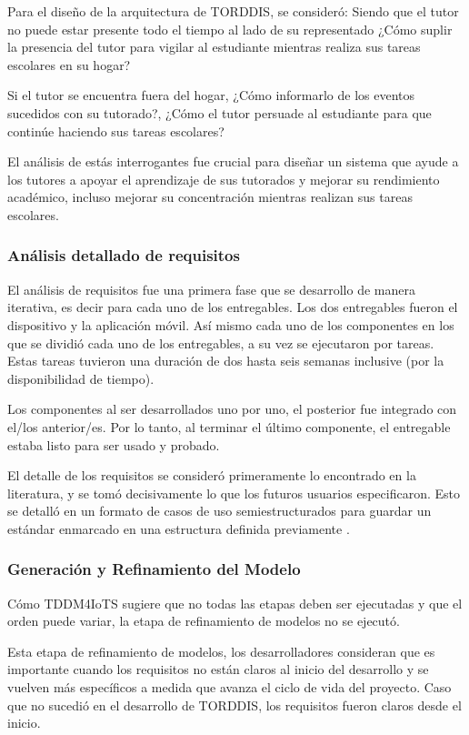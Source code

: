\documentclass[a4paper,fleqn]{cas-sc}
\begin{document}
				Para el diseño de la arquitectura de TORDDIS, se consideró: Siendo que el tutor no puede estar presente todo el tiempo al lado de su representado ¿Cómo suplir la presencia del tutor para vigilar al estudiante mientras realiza sus tareas escolares en su hogar?
			
				Si el tutor se encuentra fuera del hogar, ¿Cómo informarlo de los eventos sucedidos con su tutorado?, ¿Cómo el tutor persuade al estudiante para que continúe haciendo sus tareas escolares? 
			
				El análisis de estás interrogantes fue crucial para diseñar un sistema que ayude a los tutores a apoyar el aprendizaje de sus tutorados y mejorar su rendimiento académico, incluso mejorar su concentración mientras realizan sus tareas escolares.
			
			\subsubsection{Análisis detallado de requisitos}
				El análisis de requisitos fue una primera fase que se desarrollo de manera iterativa, es decir para cada uno de los entregables. Los dos entregables fueron el dispositivo y la aplicación móvil. Así mismo cada uno de los componentes en los que se dividió cada uno de los entregables, a su vez se ejecutaron por tareas. Estas tareas tuvieron una duración de dos hasta seis semanas inclusive (por la disponibilidad de tiempo).
			
				Los componentes al ser desarrollados uno por uno, el posterior fue integrado con el/los anterior/es. Por lo tanto, al terminar el último componente, el entregable estaba listo para ser usado y probado.
			
				El detalle de los requisitos se consideró primeramente lo encontrado en la literatura, y se tomó decisivamente lo que los futuros usuarios especificaron. Esto se detalló en un formato de casos de uso semiestructurados para guardar un estándar enmarcado en una estructura definida previamente \citep{Zegzhda2018Use}.
			
			\subsubsection{Generación y Refinamiento del Modelo}
				Cómo TDDM4IoTS \citep{Guerrero-Ulloa2020TDDM4IoTS} sugiere que no todas las etapas deben ser ejecutadas y que el orden puede variar, la etapa de refinamiento de modelos no se ejecutó.
			
				Esta etapa de refinamiento de modelos, los desarrolladores consideran que es importante cuando los requisitos no están claros al inicio del desarrollo y se vuelven más específicos a medida que avanza el ciclo de vida del proyecto. Caso que no sucedió en el desarrollo de TORDDIS, los requisitos fueron claros desde el inicio.
			
\end{document}
